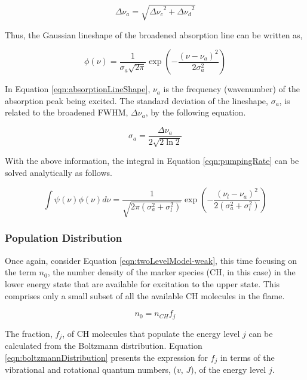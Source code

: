 \begin{equation}
  \Delta\nu_a = \sqrt{ { \Delta\nu_c }^2 + { \Delta\nu_d }^2 }
  \label{eqn:broadening}
\end{equation}

Thus, the Gaussian lineshape of the broadened absorption line can be written as,

\begin{equation}
  \phi(\nu) = \frac{1}{\sigma_a\sqrt{2\pi}} \exp{\left(-\dfrac{(\nu-\nu_a)^2}{2\sigma_a^2}\right)}
  \label{eqn:absorptionLineShape}
\end{equation}

In Equation \ref{eqn:absorptionLineShape}, \(\nu_a\) is the frequency (wavenumber) of the absorption peak being excited.
The standard deviation of the lineshape, \(\sigma_a\), is related to the broadened FWHM, \(\Delta\nu_a\), by the following equation.

\begin{equation}
  \sigma_a = \frac{\Delta\nu_a}{2 \sqrt{ 2 \ln{2} } }
\end{equation}

With the above information, the integral in Equation \ref{eqn:pumpingRate} can be solved analytically as follows.

\begin{equation}
  \int \psi(\nu) \phi(\nu) d\nu = \frac{1}{\sqrt{2\pi ( \sigma_a^2 + \sigma_l^2 )}} \exp{\left(-\frac{ (\nu_l - \nu_a )^2 }{2 ( \sigma_a^2 + \sigma_l^2 )}\right)}
  \label{eqn:absorptionIntegral}
\end{equation}

\subsubsection{Population Distribution}
\label{subsubsec:basic-model-population-distribution}

Once again, consider Equation \ref{eqn:twoLevelModel-weak}, this time focusing on the term \(n_0\), the number density of the marker species (CH, in this case) in the lower energy state that are available for excitation to the upper state.
This comprises only a small subset of all the available CH molecules in the flame.

\begin{equation}
  n_0 = n_{CH}f_j
  \label{eqn:boltzmannFraction}
\end{equation}

The fraction, \(f_j\), of CH molecules that populate the energy level \(j\) can be calculated from the Boltzmann distribution.
Equation \ref{eqn:boltzmannDistribution} presents the expression for \(f_j\) in terms of the vibrational and rotational quantum numbers, (\(v\), \(J\)), of the energy level \(j\).

